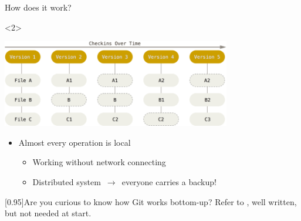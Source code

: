 \documentclass[usenames,svgnames,14pt]{beamer}
\begin{document}
\begin{frame}{How does it work?}
\begin{overlayarea}{\textwidth}{0.75\textheight}
\begin{itemize}[<2->]
\begin{itemize}
                  \end{itemize}
        \end{itemize}
        \begin{onlyenv}<2>
            \begin{center}
                  \includegraphics[width=0.75\textwidth]{Snapshots}\\
                  {\footnotesize{}}
            \end{center}
        \end{onlyenv}
        \begin{itemize}[<3>]
            \item Almost every operation is local
                  \begin{itemize}
                      \item Working without network connecting
                      \item Distributed system $\,\to\,$ everyone carries a backup!
                  \end{itemize}
        \end{itemize}
        \PrepareURLsymbol[PB]
        \small
        \begin{varblock}{}[0.95\textwidth]{Are you curious to know how Git works bottom-up?}
            Refer to , well written, but not needed at start.
        \end{varblock}
    \end{overlayarea}
\end{frame}
\end{document}
